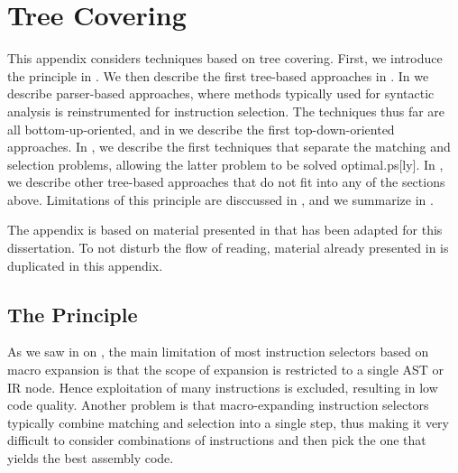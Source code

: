 %

\chapter{Tree Covering}

This appendix considers techniques based on \gls{tree covering}.
%
First, we introduce the principle in .
%
We then describe the first \gls{tree}-based approaches in
.
%
In  we describe parser-based
approaches, where methods typically used for \gls{syntactic analysis} is
reinstrumented for \gls{instruction selection}.
%
The techniques thus far are all bottom-up-oriented, and in
 we describe the first top-down-oriented
approaches.
%
In , we describe the first
techniques that separate the \gls{matching} and \gls{selection} problems,
allowing the latter problem to be solved \gls{optimal.ps}[ly].
%
In , we describe other
\gls{tree}-based approaches that do not fit into any of the sections above.
%
Limitations of this principle are disccussed in , and
we summarize in .

The appendix is based on material presented in
\cite[Chap.]{HjortBlindell:2016:Survey} that has been adapted for
this dissertation.
%
To not disturb the flow of reading, material already presented in
 is duplicated in this appendix.


\section{The Principle}

As we saw in  on ,
the main limitation of most \glspl{instruction selector} based on \gls{macro
  expansion} is that the scope of expansion is restricted to a single \gls{AST}
or \gls{IR} \gls{node}.
%
Hence exploitation of many \glspl{instruction} is excluded, resulting in low
code quality.
%
Another problem is that \gls{macro}-expanding \glspl{instruction selector}
typically combine \gls{matching} and \gls{selection} into a single step, thus
making it very difficult to consider combinations of \glspl{instruction} and
then pick the one that yields the best \gls{assembly code}.

